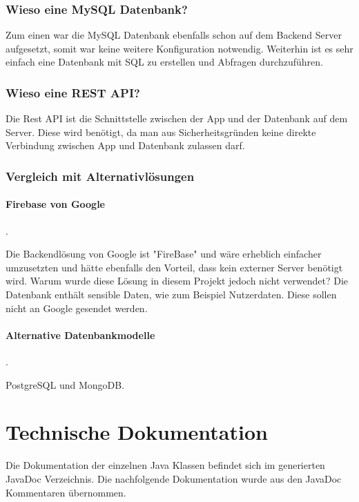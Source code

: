 \documentclass{scrartcl}
\begin{document}
\subsubsection{Wieso eine MySQL Datenbank?}

Zum einen war die MySQL Datenbank ebenfalls schon auf dem Backend Server aufgesetzt, somit war keine weitere Konfiguration notwendig. Weiterhin ist es sehr einfach eine Datenbank mit SQL zu erstellen und Abfragen durchzuführen.

\subsubsection{Wieso eine REST API?}

Die Rest API ist die Schnittstelle zwischen der App und der Datenbank auf dem Server. Diese wird benötigt, da man aus Sicherheitsgründen keine direkte Verbindung zwischen App und Datenbank zulassen darf.

\subsubsection{Vergleich mit Alternativlösungen}

\paragraph{Firebase von Google}.\newline

\noindent Die Backendlösung von Google ist "FireBase" und wäre erheblich einfacher umzusetzten und hätte ebenfalls den Vorteil, dass kein externer Server benötigt wird. Warum wurde diese Lösung in diesem Projekt jedoch nicht verwendet? Die Datenbank enthält sensible Daten, wie zum Beispiel Nutzerdaten. Diese sollen nicht an Google gesendet werden.

\paragraph{Alternative Datenbankmodelle}.\newline

\noindent PostgreSQL und MongoDB.

\newpage

\section{Technische Dokumentation}

Die Dokumentation der einzelnen Java Klassen befindet sich im generierten JavaDoc Verzeichnis. Die nachfolgende Dokumentation wurde aus den JavaDoc Kommentaren übernommen.
\end{document}
